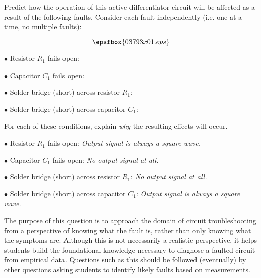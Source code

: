 

Predict how the operation of this active differentiator circuit will be affected as a result of the following faults.  Consider each fault independently (i.e. one at a time, no multiple faults):

$$\epsfbox{03793x01.eps}$$

\medskip
\item{$\bullet$} Resistor $R_1$ fails open:
\vskip 5pt
\item{$\bullet$} Capacitor $C_1$ fails open:
\vskip 5pt
\item{$\bullet$} Solder bridge (short) across resistor $R_1$:
\vskip 5pt
\item{$\bullet$} Solder bridge (short) across capacitor $C_1$:
\medskip

For each of these conditions, explain {\it why} the resulting effects will occur.







\medskip
\item{$\bullet$} Resistor $R_1$ fails open: {\it Output signal is always a square wave.}
\vskip 5pt
\item{$\bullet$} Capacitor $C_1$ fails open: {\it No output signal at all.}
\vskip 5pt
\item{$\bullet$} Solder bridge (short) across resistor $R_1$: {\it No output signal at all.}
\vskip 5pt
\item{$\bullet$} Solder bridge (short) across capacitor $C_1$: {\it Output signal is always a square wave.}
\medskip







The purpose of this question is to approach the domain of circuit troubleshooting from a perspective of knowing what the fault is, rather than only knowing what the symptoms are.  Although this is not necessarily a realistic perspective, it helps students build the foundational knowledge necessary to diagnose a faulted circuit from empirical data.  Questions such as this should be followed (eventually) by other questions asking students to identify likely faults based on measurements.





